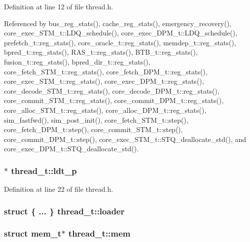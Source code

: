 Definition at line 12 of file thread.h.

Referenced by bus\_\-reg\_\-stats(), cache\_\-reg\_\-stats(), emergency\_\-recovery(), core\_\-exec\_\-STM\_\-t::LDQ\_\-schedule(), core\_\-exec\_\-DPM\_\-t::LDQ\_\-schedule(), prefetch\_\-t::reg\_\-stats(), core\_\-oracle\_\-t::reg\_\-stats(), memdep\_\-t::reg\_\-stats(), bpred\_\-t::reg\_\-stats(), RAS\_\-t::reg\_\-stats(), BTB\_\-t::reg\_\-stats(), fusion\_\-t::reg\_\-stats(), bpred\_\-dir\_\-t::reg\_\-stats(), core\_\-fetch\_\-STM\_\-t::reg\_\-stats(), core\_\-fetch\_\-DPM\_\-t::reg\_\-stats(), core\_\-exec\_\-STM\_\-t::reg\_\-stats(), core\_\-exec\_\-DPM\_\-t::reg\_\-stats(), core\_\-decode\_\-STM\_\-t::reg\_\-stats(), core\_\-decode\_\-DPM\_\-t::reg\_\-stats(), core\_\-commit\_\-STM\_\-t::reg\_\-stats(), core\_\-commit\_\-DPM\_\-t::reg\_\-stats(), core\_\-alloc\_\-STM\_\-t::reg\_\-stats(), core\_\-alloc\_\-DPM\_\-t::reg\_\-stats(), sim\_\-fastfwd(), sim\_\-post\_\-init(), core\_\-fetch\_\-STM\_\-t::step(), core\_\-fetch\_\-DPM\_\-t::step(), core\_\-commit\_\-STM\_\-t::step(), core\_\-commit\_\-DPM\_\-t::step(), core\_\-exec\_\-STM\_\-t::STQ\_\-deallocate\_\-std(), and core\_\-exec\_\-DPM\_\-t::STQ\_\-deallocate\_\-std().
\subsubsection[{ldt\_\-p}]{$\ast$ {\bf thread\_\-t::ldt\_\-p}}\label{structthread__t_e98de5d835e817cbeac9cc573ef5e30d}




Definition at line 22 of file thread.h.
\subsubsection[{loader}]{\setlength{\rightskip}{0pt plus 5cm}struct \{ ... \}   {\bf thread\_\-t::loader}}\label{structthread__t_07734cbe5f64b48d7f77dc9c36ca42a6}


\subsubsection[{mem}]{\setlength{\rightskip}{0pt plus 5cm}struct {\bf mem\_\-t}$\ast$ {\bf thread\_\-t::mem}\hspace{0.3cm}{\tt  [read]}}\label{structthread__t_5a5007f71bf42d78ac7305cd30f7dd3f}




